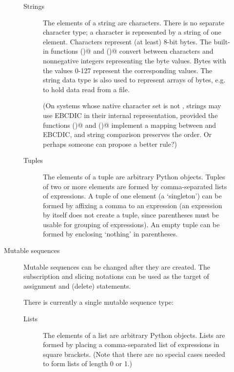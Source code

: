 \begin{description}
\begin{description}
\begin{description}
\item[Strings]
The elements of a string are characters.  There is no separate
character type; a character is represented by a string of one element.
Characters represent (at least) 8-bit bytes.  The built-in
functions \verb@chr()@ and \verb@ord()@ convert between characters
and nonnegative integers representing the byte values.
Bytes with the values 0-127 represent the corresponding \ASCII{} values.
The string data type is also used to represent arrays of bytes, e.g.
to hold data read from a file.

(On systems whose native character set is not \ASCII{}, strings may use
EBCDIC in their internal representation, provided the functions
\verb@chr()@ and \verb@ord()@ implement a mapping between \ASCII{} and
EBCDIC, and string comparison preserves the \ASCII{} order.
Or perhaps someone can propose a better rule?)

\item[Tuples]
The elements of a tuple are arbitrary Python objects.
Tuples of two or more elements are formed by comma-separated lists
of expressions.  A tuple of one element (a `singleton') can be formed
by affixing a comma to an expression (an expression by itself does
not create a tuple, since parentheses must be usable for grouping of
expressions).  An empty tuple can be formed by enclosing `nothing' in
parentheses.

\end{description} %

\item[Mutable sequences]
Mutable sequences can be changed after they are created.  The
subscription and slicing notations can be used as the target of
assignment and \verb@del@ (delete) statements.

There is currently a single mutable sequence type:

\begin{description}

\item[Lists]
The elements of a list are arbitrary Python objects.  Lists are formed
by placing a comma-separated list of expressions in square brackets.
(Note that there are no special cases needed to form lists of length 0
or 1.)


\end{description}
\end{description}
\end{description}
